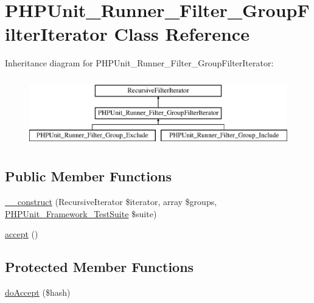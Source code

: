 \hypertarget{class_p_h_p_unit___runner___filter___group_filter_iterator}{}\section{P\+H\+P\+Unit\+\_\+\+Runner\+\_\+\+Filter\+\_\+\+Group\+Filter\+Iterator Class Reference}
\label{class_p_h_p_unit___runner___filter___group_filter_iterator}
Inheritance diagram for P\+H\+P\+Unit\+\_\+\+Runner\+\_\+\+Filter\+\_\+\+Group\+Filter\+Iterator\+:\begin{figure}[H]
\begin{center}
\leavevmode
\includegraphics[height=3.000000cm]{class_p_h_p_unit___runner___filter___group_filter_iterator}
\end{center}
\end{figure}
\subsection*{Public Member Functions}
\begin{DoxyCompactItemize}
\item 
\mbox{\hyperlink{class_p_h_p_unit___runner___filter___group_filter_iterator_a6ac03bda5416e2a5dc0de75a98a2d305}{\+\_\+\+\_\+construct}} (Recursive\+Iterator \$iterator, array \$groups, \mbox{\hyperlink{class_p_h_p_unit___framework___test_suite}{P\+H\+P\+Unit\+\_\+\+Framework\+\_\+\+Test\+Suite}} \$suite)
\item 
\mbox{\hyperlink{class_p_h_p_unit___runner___filter___group_filter_iterator_acb64affba32059c09533892d9ded224a}{accept}} ()
\end{DoxyCompactItemize}
\subsection*{Protected Member Functions}
\begin{DoxyCompactItemize}
\item 
\mbox{\hyperlink{class_p_h_p_unit___runner___filter___group_filter_iterator_acbbdccc716fb8365bbb7282b6851cc19}{do\+Accept}} (\$hash)
\end{DoxyCompactItemize}
